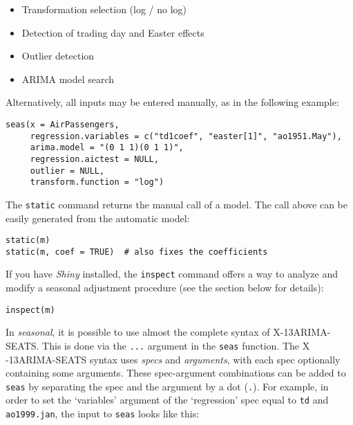 \begin{itemize}
\itemsep1pt\parskip0pt
\item
  Transformation selection (log / no log)
\item
  Detection of trading day and Easter effects
\item
  Outlier detection
\item
  ARIMA model search
\end{itemize}

Alternatively, all inputs may be entered manually, as in the following
example:

\begin{verbatim}
seas(x = AirPassengers, 
     regression.variables = c("td1coef", "easter[1]", "ao1951.May"), 
     arima.model = "(0 1 1)(0 1 1)", 
     regression.aictest = NULL,
     outlier = NULL, 
     transform.function = "log")
\end{verbatim}

The \texttt{static} command returns the manual call of a model. The call
above can be easily generated from the automatic model:

\begin{verbatim}
static(m)
static(m, coef = TRUE)  # also fixes the coefficients
\end{verbatim}

If you have \emph{Shiny} installed, the \texttt{inspect} command offers
a way to analyze and modify a seasonal adjustment procedure (see the
section below for details):

\begin{verbatim}
inspect(m)
\end{verbatim}


In \emph{seasonal}, it is possible to use almost the complete syntax of
X-13ARIMA- SEATS. This is done via the \texttt{...} argument in the
\texttt{seas} function. The X -13ARIMA-SEATS syntax uses \emph{specs}
and \emph{arguments}, with each spec optionally containing some
arguments. These spec-argument combinations can be added to
\texttt{seas} by separating the spec and the argument by a dot
(\texttt{.}). For example, in order to set the `variables' argument of
the `regression' spec equal to \texttt{td} and \texttt{ao1999.jan}, the
input to \texttt{seas} looks like this:

